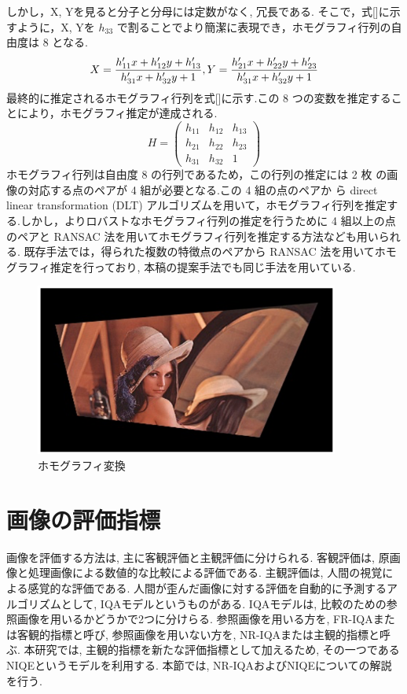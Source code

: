 \documentclass[a4paper,12pt]{jsreport}
\begin{document}
しかし，X, Yを見ると分子と分母には定数がなく, 冗長である. そこで，式[]に示すように，X, Yを $h_33$ で割ることでより簡潔に表現でき，ホモグラフィ行列の自由度は 8 となる.
$$X = \frac{h'_{11}x + h'_{12}y + h'_{13}}{h'_{31}x + h'_{32}y + 1}, Y = \frac{h'_{21}x + h'_{22}y + h'_{23}}{h'_{31}x + h'_{32}y + 1} \\$$
最終的に推定されるホモグラフィ行列を式[]に示す.この 8 つの変数を推定することにより，ホモグラフィ推定が達成される.
\[
	H = \left(
		\begin{array}{ccc}
			h_{11} & h_{12} & h_{13}\\
			h_{21} & h_{22} & h_{23}\\
			h_{31} & h_{32} & 1 
		\end{array}
	\right)
\]
ホモグラフィ行列は自由度 8 の行列であるため，この行列の推定には 2 枚 の画像の対応する点のペアが 4 組が必要となる.この 4 組の点のペアか ら direct linear transformation (DLT) アルゴリズムを用いて，ホモグラフィ行列を推定する.しかし，よりロバストなホモグラフィ行列の推定を行うために 4 組以上の点のペアと RANSAC 法を用いてホモグラフィ行列を推定する方法なども用いられる. 既存手法では，得られた複数の特徴点のペアから RANSAC 法を用いてホモグラフィ推定を行っており, 本稿の提案手法でも同じ手法を用いている.
\begin{figure}[h]
  \begin{center}
    \includegraphics[width=10cm]{./homography_transformation.png}
    \caption{ホモグラフィ変換}
  \end{center}
\end{figure}



\section{画像の評価指標}
画像を評価する方法は, 主に客観評価と主観評価に分けられる. 客観評価は, 原画像と処理画像による数値的な比較による評価である. 主観評価は, 人間の視覚による感覚的な評価である. 
人間が歪んだ画像に対する評価を自動的に予測するアルゴリズムとして, IQAモデルというものがある. IQAモデルは, 比較のための参照画像を用いるかどうかで2つに分けらる. 参照画像を用いる方を, FR-IQAまたは客観的指標と呼び, 参照画像を用いない方を, NR-IQAまたは主観的指標と呼ぶ. 本研究では, 主観的指標を新たな評価指標として加えるため, その一つであるNIQE\cite{6353522}というモデルを利用する. 本節では, NR-IQAおよびNIQEについての解説を行う. 
\end{document}

